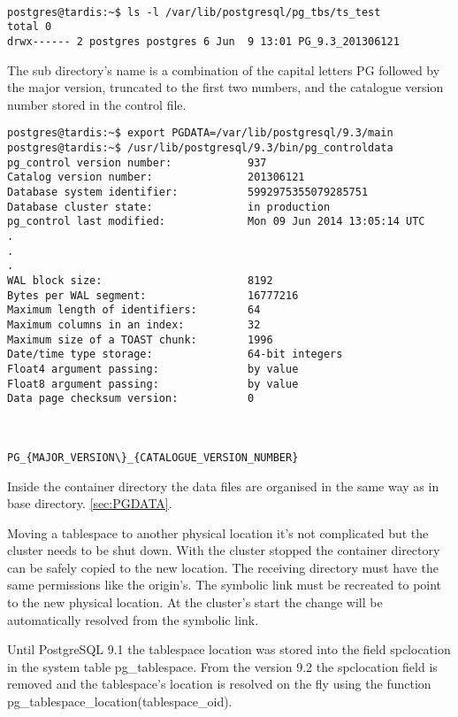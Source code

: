 \begin{verbatim}

postgres@tardis:~$ ls -l /var/lib/postgresql/pg_tbs/ts_test
total 0
drwx------ 2 postgres postgres 6 Jun  9 13:01 PG_9.3_201306121

\end{verbatim}

The sub directory's name is a combination of the capital letters PG followed by the major version, 
truncated to the first two numbers, and the catalogue version number stored in the control file.\newline



\begin{verbatim}
postgres@tardis:~$ export PGDATA=/var/lib/postgresql/9.3/main
postgres@tardis:~$ /usr/lib/postgresql/9.3/bin/pg_controldata 
pg_control version number:            937
Catalog version number:               201306121
Database system identifier:           5992975355079285751
Database cluster state:               in production
pg_control last modified:             Mon 09 Jun 2014 13:05:14 UTC
.
.
.
WAL block size:                       8192
Bytes per WAL segment:                16777216
Maximum length of identifiers:        64
Maximum columns in an index:          32
Maximum size of a TOAST chunk:        1996
Date/time type storage:               64-bit integers
Float4 argument passing:              by value
Float8 argument passing:              by value
Data page checksum version:           0



PG_{MAJOR_VERSION\}_{CATALOGUE_VERSION_NUMBER}

\end{verbatim}



Inside the container directory the data files are organised in the same way as in base directory.
\ref{sec:PGDATA}.\newline

Moving a tablespace to another physical location it's not complicated but the cluster needs to be shut down.
With the cluster stopped the container directory can be safely copied to the new location. The receiving 
directory must have the same permissions  like the origin's. The symbolic link must be recreated to point 
to the new physical location. At the cluster's start the change will be automatically resolved from 
the symbolic link.\newline

Until PostgreSQL 9.1 the tablespace location was stored into the field spclocation in the system table 
pg\_tablespace. From the version 9.2 the spclocation field is removed and the 
tablespace's location is resolved on the fly using the function 
pg\_tablespace\_location(tablespace\_oid).\newline

